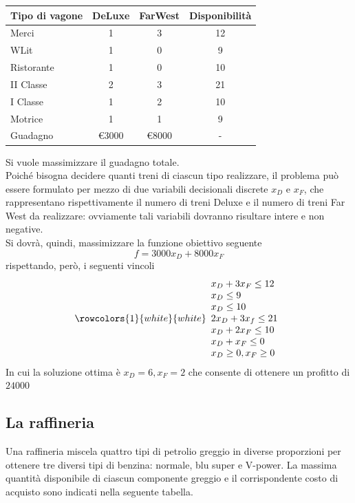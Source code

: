 \documentclass[a4paper]{extarticle}
\renewcommand\arraystretch{}
\begin{document}
\begin{table}[H]
\setlength{\tabcolsep}{8pt}
\renewcommand{\arraystretch}{1.5}
\noindent
\centering
\begin{tabular}{l|c|c|c}
    \hline
    Tipo di vagone & DeLuxe & FarWest & Disponibilità\\
    \hline
    Merci      & 1 & 3 & 12\\
    WLit       & 1 & 0 & 9\\
    Ristorante & 1 & 0 & 10\\
    II Classe  & 2 & 3 & 21\\
    I Classe   & 1 & 2 & 10\\
    Motrice    & 1 & 1 & 9\\
    \hline
    Guadagno   & €3000 & €8000 & -\\
    \hline
\end{tabular}
\end{table}

\vspace{1em}
\noindent
Si vuole massimizzare il guadagno totale.\\
Poiché bisogna decidere quanti treni di ciascun tipo realizzare, il problema può essere formulato per mezzo di due variabili decisionali discrete $x_D$ e $x_F$, che rappresentano rispettivamente il numero di treni Deluxe e il numero di treni Far West da realizzare: ovviamente tali variabili dovranno risultare intere e non negative.\\
Si dovrà, quindi, massimizzare la funzione obiettivo seguente
\[f = 3000 x_D + 8000 x_F\]
rispettando, però, i seguenti vincoli
\[\rowcolors{1}{white}{white}
\begin{array}{l}
    x_D + 3x_F \leq 12\\
    x_D \leq 9\\
    x_D \leq 10\\
    2x_D + 3 x_f \leq 21\\
    x_D + 2x_F \leq 10\\
    x_D + x_F \leq 0\\
    x_D \geq 0, x_F \geq 0
\end{array}\]
In cui la soluzione ottima è $x_D=6,x_F=2$ che consente di ottenere un profitto di $24000$

\vspace{1em}
\noindent
\subsection{La raffineria}
Una raffineria miscela quattro tipi di petrolio greggio in diverse proporzioni per ottenere tre diversi tipi di benzina: normale, blu super e V-power. La massima quantità disponibile di ciascun componente greggio e il corrispondente costo di acquisto sono indicati nella seguente tabella.
\end{document}

